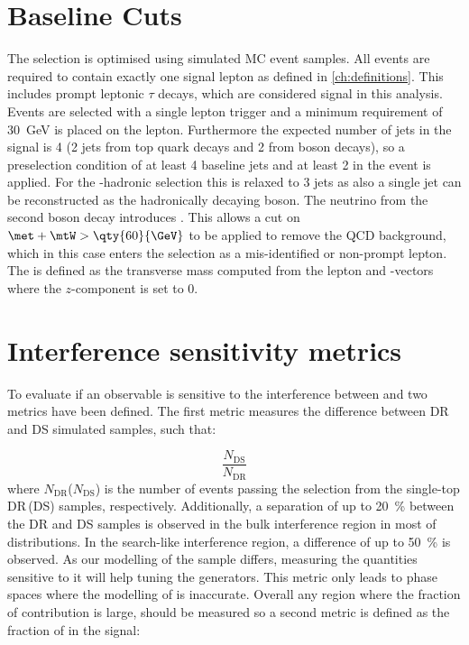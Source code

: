 \section{Baseline Cuts}%
\label{sec:BaselineCuts}
The selection is optimised using simulated MC event samples.
All events are required to contain exactly one signal lepton as defined
in \cref{ch:definitions}. This includes  prompt leptonic \( \tau \) decays, which are considered signal in this analysis.
 Events are selected with a single lepton trigger
and a minimum \pt requirement of \qty{30}{\GeV} is placed on the lepton.
Furthermore the expected number of jets in the
signal is 4 (2 jets from top quark decays and 2 from \Wboson boson decays),
so a preselection condition of at least 4 baseline jets and at least 2 \bjets
in the event is applied. For the \Wboson-hadronic selection this is relaxed to 3 jets
as also a single jet can be reconstructed as the hadronically decaying \Wboson boson.
The neutrino from the second \Wboson boson decay introduces \met.
This allows a cut on \( \met + \mtW > \qty{60}{\GeV} \)
to be applied to remove the QCD background, which in this case enters
the selection as a mis-identified or non-prompt lepton.
The \mtW is defined as the transverse mass computed from
the lepton and -vectors where the \(z\)-component is set to 0.



\section{Interference sensitivity metrics}

To evaluate if an observable is sensitive to the interference between
\tW and \ttbar two metrics have been defined. 
The first metric measures the difference between DR and DS simulated \tW samples, such that:

\begin{equation}
  \dfrac{N_\mathrm{DS}}{N_\mathrm{DR}}
  \label{eq:metric:DRDS}
\end{equation}
where \( N_\mathrm{DR} \)(\( N_\mathrm{DS} \)) is the number of events passing the selection from the single-top DR\,(DS) samples, respectively.  %
Additionally, a separation of up to \qty{20}{\%} between the DR and DS samples is observed in the bulk interference region in most of distributions.
In the search-like interference region, a difference of up to \qty{50}{\%} is observed.
As our modelling of the \tW sample differs, measuring the quantities sensitive to it will help tuning the generators.
This metric only leads to phase spaces where the modelling of \tW is inaccurate. Overall any region where the fraction
of \tW contribution is large, should be measured so a second metric is defined as the fraction of \tW in the signal:

